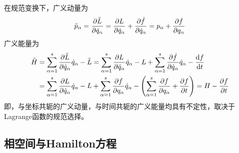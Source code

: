 在规范变换下，广义动量为
\begin{equation*}
	\tilde{p}_\alpha = \frac{\partial \tilde{L}}{\partial \dot{q}_\alpha} = \frac{\partial L}{\partial \dot{q}_\alpha} + \frac{\partial \dot{f}}{\partial \dot{q}_\alpha} = p_\alpha + \frac{\partial f}{\partial q_\alpha}
\end{equation*}
广义能量为
\begin{align*}
	\tilde{H} & = \sum_{\alpha=1}^s \frac{\partial \tilde{L}}{\partial \dot{q}_\alpha} \dot{q}_\alpha - \tilde{L} = \sum_{\alpha=1}^s \frac{\partial L}{\partial \dot{q}_\alpha} \dot{q}_\alpha - L + \sum_{\alpha=1}^s \frac{\partial \dot{f}}{\partial \dot{q}_\alpha} \dot{q}_\alpha - \frac{\mathrm{d} f}{\mathrm{d} t} \\
	& = \sum_{\alpha=1}^s \frac{\partial L}{\partial \dot{q}_\alpha} \dot{q}_\alpha - L + \sum_{\alpha=1}^s \frac{\partial f}{\partial q_\alpha} \dot{q}_\alpha - \left(\sum_{\alpha=1}^s \frac{\partial f}{\partial q_\alpha} + \frac{\partial f}{\partial t}\right) = H - \frac{\partial f}{\partial t}
\end{align*}
即，与坐标共轭的广义动量，与时间共轭的广义能量均具有不定性，取决于Lagrange函数的规范选择。

\subsection{相空间与Hamilton方程}

